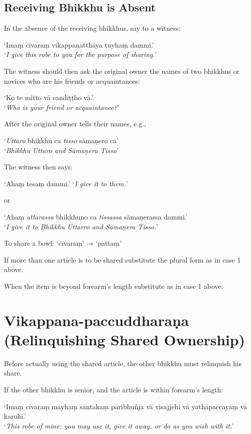 \subsection{Receiving Bhikkhu is Absent}
\label{receiving-bhikkhu-absent}

In the absence of the receiving bhikkhus, say to a witness:

‘Imaṃ cīvaraṃ vikappanatthāya tuyhaṃ dammi.’\\
‘\emph{I give this robe to you for the purpose of sharing.}’

The witness should then ask the original owner the names of two bhikkhus or
novices who are his friends or acquaintances:

‘Ko te mitto vā sandiṭṭho vā.’\\
‘\emph{Who is your friend or acquaintance?}’

After the original owner tells their names, e.g.,

‘\emph{Uttaro} bhikkhu ca \emph{tisso} sāmaṇero ca’\\
‘\emph{Bhikkhu Uttaro and Sāmaṇera Tisso}’

The witness then says:

‘Ahaṃ tesaṃ dammi.’ ‘\emph{I give it to them.}’

or

‘Ahaṃ \emph{uttarassa} bhikkhuno ca \emph{tissassa} sāmaṇerassa dammi.’\\
‘\emph{I give it to Bhikkhu Uttarro and Sāmaṇera Tisso.}’


To share a bowl: ‘cīvaraṃ’ → ‘pattaṃ’

If more than one article is to be shared substitute the plural form as in case 1
above.

When the item is beyond forearm's length substitute as in case 1 above.

\section[Vikappana-paccuddharaṇa (Relinquishing)]{Vikappana-paccuddharaṇa (Relinquishing Shared Ownership)}

Before actually using the shared article, the other bhikkhu must relinquish his
share.

If the other bhikkhu is senior, and the article is within forearm's length:

‘Imaṃ cīvaraṃ mayhaṃ santakaṃ paribhuñja vā visajjehi vā yathāpaccayaṃ vā karohi.’\\
‘\emph{This robe of mine: you may use it, give it away, or do as you wish with it.}’

